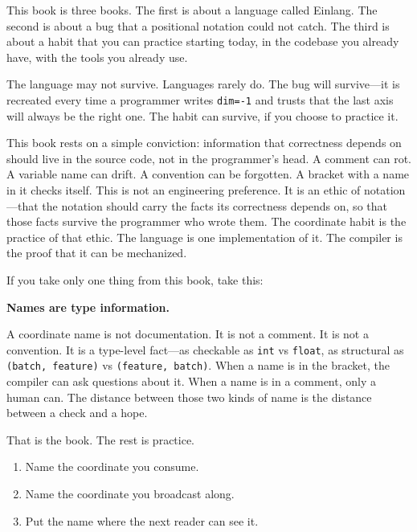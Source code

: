 \documentclass[11pt,titlepage]{article}
\providecommand{\tightlist}{%
  \setlength{\itemsep}{0pt}\setlength{\parskip}{0pt}}
\begin{document}
This book is three books. The first is about a language called Einlang.
The second is about a bug that a positional notation could not catch.
The third is about a habit that you can practice starting today, in the
codebase you already have, with the tools you already use.

The language may not survive. Languages rarely do. The bug will
survive---it is recreated every time a programmer writes \texttt{dim=-1}
and trusts that the last axis will always be the right one. The habit
can survive, if you choose to practice it.

This book rests on a simple conviction: information that correctness
depends on should live in the source code, not in the programmer's head.
A comment can rot. A variable name can drift. A convention can be
forgotten. A bracket with a name in it checks itself. This is not an
engineering preference. It is an ethic of notation---that the notation
should carry the facts its correctness depends on, so that those facts
survive the programmer who wrote them. The coordinate habit is the
practice of that ethic. The language is one implementation of it. The
compiler is the proof that it can be mechanized.

\vspace{2em}

\vspace{2em}

If you take only one thing from this book, take this:

\textbf{Names are type information.}

A coordinate name is not documentation. It is not a comment. It is not a
convention. It is a type-level fact---as checkable as \texttt{int} vs
\texttt{float}, as structural as \texttt{(batch,\ feature)} vs
\texttt{(feature,\ batch)}. When a name is in the bracket, the compiler
can ask questions about it. When a name is in a comment, only a human
can. The distance between those two kinds of name is the distance
between a check and a hope.

That is the book. The rest is practice.

\begin{enumerate}
\def\labelenumi{\arabic{enumi}.}
\tightlist
\item
  Name the coordinate you consume.
\item
  Name the coordinate you broadcast along.
\item
  Put the name where the next reader can see it.
\end{enumerate}
\end{document}

